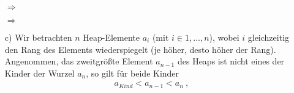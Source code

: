 \documentclass{article}
\begin{document}
\begin{enumerate}
        \begin{minipage}[t]{0.05\textwidth}
            \vspace*{-2cm}
            $\Rightarrow$
        \end{minipage}
        \begin{minipage}[t]{0.4\textwidth}
        \end{minipage}
        \begin{minipage}[t]{0.02\textwidth}
            \vspace*{-2cm}
            $\Rightarrow$
        \end{minipage}
        \begin{minipage}[t]{0.3\textwidth}
        \end{minipage}
        \item[c)] Wir betrachten $n$ Heap-Elemente $a_i$ (mit $i \in {1, ..., n}$), wobei $i$ gleichzeitig den Rang des Elements wiederspiegelt (je höher, desto höher der Rang). Angenommen, das zweitgrößte Element $a_{n-1}$ des Heaps ist nicht eines der Kinder der Wurzel $a_n$, so gilt für beide Kinder
        \begin{align*}
            a_{Kind} < a_{n-1} < a_{n} \: ,
        \end{align*}

\end{enumerate}
\end{document}
